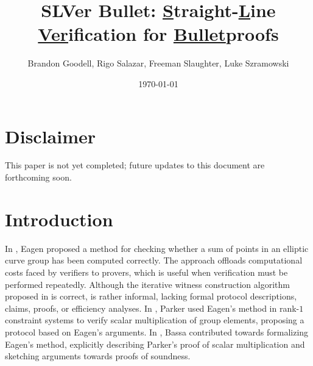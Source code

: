 \documentclass[11pt,letterpaper]{article}
\title{
SLVer Bullet: \underline{S}traight-\underline{L}ine \underline{Ver}ification for \underline{Bullet}proofs
}
\author{Brandon Goodell, Rigo Salazar, Freeman Slaughter, Luke Szramowski
}
\affil{$\mathsf{Cypher \ Stack}$}
\date{\today}
\theoremstyle{definition}
\newcommand{\6}{\mathbf}
\newcommand{\7}{\mathcal}
\begin{document}
\maketitle

\section*{Disclaimer}

This paper is not yet completed; future updates to this document are forthcoming soon.

\section{Introduction}


In \cite{Eagen}, Eagen proposed a method for checking whether a sum of points in an elliptic curve group has been computed correctly. The approach offloads computational costs faced by verifiers to provers, which is useful when verification must be performed repeatedly.
Although the iterative witness construction algorithm proposed in \cite{Eagen} is correct, \cite{Eagen} is rather informal, lacking formal protocol descriptions, claims, proofs, or efficiency analyses. In \cite{Kayaba}, Parker used Eagen's method  in rank-$1$ constraint systems to verify  scalar multiplication of group elements, proposing a protocol based on Eagen's arguments. In \cite{SoundnessForDLP}, Bassa contributed towards formalizing Eagen's method, explicitly describing Parker's proof of scalar multiplication and sketching arguments towards proofs of soundness.




\end{document}
